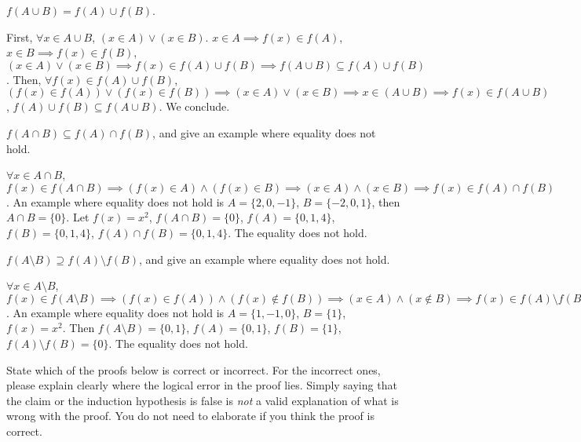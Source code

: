 \documentclass[11pt]{article}
\begin{document}
\begin{Parts}
	\Part $f(A \cup B) = f(A) \cup f(B)$.
	
	\begin{Answer}
		First, $\forall x \in A \cup B$, $(x \in A) \lor (x \in B)$. $x \in A \implies f(x) \in f(A)$, $x \in B
		\implies f(x) \in f(B)$, $(x \in A) \lor (x \in B) \implies f(x) \in f(A) \cup f(B) \implies f(A \cup B) 
		\subseteq f(A) \cup f(B)$. Then, $\forall f(x) \in f(A) \cup f(B)$, $(f(x) \in f(A)) \lor (f(x) \in f(B))
		\implies (x \in A) \lor (x \in B) \implies x \in (A \cup B) \implies f(x) \in f(A \cup B)$, $f(A) \cup f(B)
		\subseteq f(A \cup B)$. We conclude. 
	\end{Answer}

	\Part $f(A \cap B) \subseteq f(A) \cap f(B)$, and give an example where equality does not hold.
	
	\begin{Answer}
		$\forall x \in A \cap B$, $f(x) \in f(A \cap B) \implies (f(x) \in A) \land (f(x) \in B) \implies (x \in A)
		\land (x \in B) \implies f(x) \in f(A) \cap f(B)$. An example where equality does not hold is $A = \{2, 0, -1\}$, 
		$B = \{-2, 0, 1\}$, then $A \cap B = \{0\}$. Let $f(x) = x^2$, $f(A \cap B) = \{0\}$, $f(A) = \{0, 1, 4\}$, 
		$f(B) = \{0, 1, 4\}$, $f(A) \cap f(B) = \{0, 1, 4\}$. The equality does not hold.  
	\end{Answer}

	\Part $f(A \setminus B) \supseteq f(A) \setminus f(B)$, and give an example where equality does not hold.
	
	\begin{Answer}
		$\forall x \in A \setminus B$, $f(x) \in f(A \setminus B) \implies (f(x) \in f(A)) \land (f(x) \notin f(B))
		\implies (x \in A) \land (x \notin B) \implies f(x) \in f(A) \setminus f(B)$. An example where equality does 
		not hold is $A = \{1, -1, 0\}$, $B = \{1\}$, $f(x) = x^2$. Then $f(A \setminus B) = \{0, 1\}$, $f(A) = \{0, 1\}$,
		$f(B) = \{1\}$, $f(A) \setminus f(B) = \{0\}$. The equality does not hold. 
	\end{Answer}
	
\end{Parts}

\newpage
{}

State which of the proofs below is correct or incorrect. For the incorrect ones, please explain clearly where the 
logical error in the proof lies. Simply saying that the claim or the induction hypothesis is false is \emph{not} 
a valid explanation of what is wrong with the proof. You do not need to elaborate if you think the proof is correct.
\end{document}
